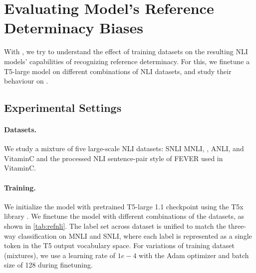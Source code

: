 




\section{Evaluating Model's Reference Determinacy Biases}
\label{sec:results}
With \datasetname, we try to understand the effect of training datasets on the resulting NLI models' capabilities of recognizing reference determinacy. For this, we finetune a T5-large \cite{raffel2020exploring} model on different combinations of NLI datasets, and study their behaviour on \datasetname. 

\subsection{Experimental Settings}
\paragraph{Datasets.} We study a mixture of five large-scale NLI datasets: SNLI \cite{bowman-etal-2015-large} MNLI, \cite{williams-etal-2018-broad},
ANLI, \cite{nie-etal-2020-adversarial} and VitaminC \cite{schuster-etal-2021-get} and the processed NLI sentence-pair style of FEVER used in VitaminC. 

\paragraph{Training.} We initialize the model with pretrained T5-large 1.1 checkpoint using the T5x library \cite{roberts2022t5x}. We finetune the model with different combinations of the datasets, as shown in \autoref{tab:refnli}. The label set across dataset is unified to match the three-way classification on MNLI and SNLI, where each label is represented as a single token in the T5 output vocabulary space. For variations of training dataset (mixtures), we use a learning rate of $1e-4$ with the Adam optimizer \cite{Kingma2014AdamAM} and batch size of 128 during finetuning. 

